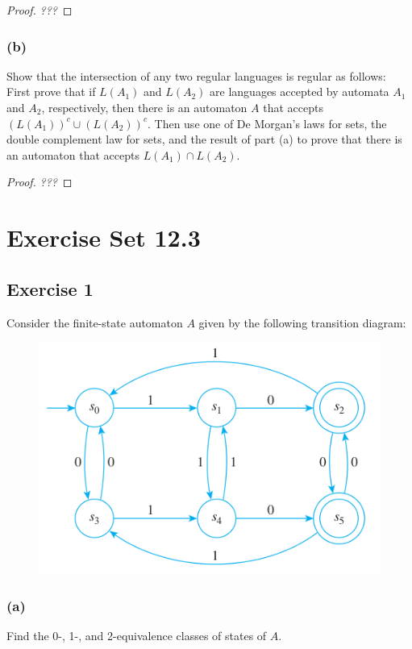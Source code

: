 \documentclass[14pt]{extarticle}
\begin{document}
\begin{proof}
{\it ???}
\end{proof}

\subsubsection{(b)}
Show that the intersection of any two regular languages is regular as follows: First prove that if \(L(A_1)\) and 
\(L(A_2)\) are languages accepted by automata \(A_1\) and \(A_2\), respectively, then there is an automaton \(A\) that 
accepts \((L(A_1))^c \cup (L(A_2))^c\). Then use one of De Morgan’s laws for sets, the double complement law for sets, 
and the result of part (a) to prove that there is an automaton that accepts \(L(A_1) \cap L(A_2)\).

\begin{proof}
{\it ???}
\end{proof}

\section{Exercise Set 12.3}
\subsection{Exercise 1}
Consider the finite-state automaton \(A\) given by the following transition diagram:

\begin{figure}[ht!]
\centering
\includegraphics[scale=0.5]{../images/12.3.1.png}
\end{figure}

\subsubsection{(a)}
Find the 0-, 1-, and 2-equivalence classes of states of \(A\).
\end{document}
